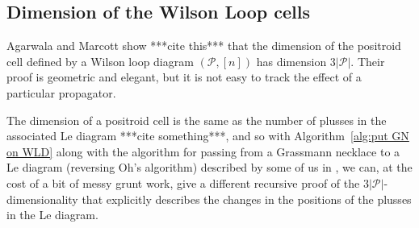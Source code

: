 \documentclass[11pt]{article}
\newcommand{\cP}{\mathcal{P}}
\theoremstyle{remark}
\theoremstyle{definition}
\begin{document}
\subsection{Dimension of the Wilson Loop cells}

Agarwala and Marcott show ***cite this*** that the dimension of the positroid cell defined by a Wilson loop diagram $(\cP, [n])$ has dimension $3|\cP|$. Their proof is geometric and elegant, but it is not easy to track the effect of a particular propagator.

The dimension of a positroid cell is the same as the number of plusses in the associated Le diagram ***cite something***, and so with Algorithm~\ref{alg:put GN on WLD} along with the algorithm for passing from a Grassmann necklace to a Le diagram (reversing Oh's algorithm) described by some of us in \cite{reversingOh}, we can, at the cost of a bit of messy grunt work, give a different recursive proof of the $3|\cP|$-dimensionality that explicitly describes the changes in the positions of the plusses in the Le diagram.

%
%
%
%
%
\end{document}
